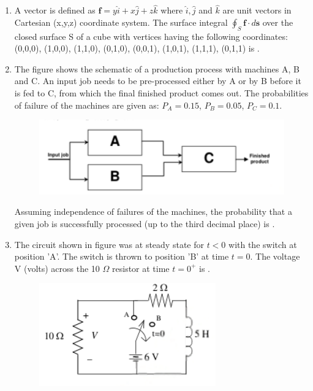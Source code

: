 \documentclass[journal,12pt,onecolumn]{IEEEtran}
\theoremstyle{remark}
\begin{document}
\begin{enumerate}
    \item A vector is defined as $\mathbf{f} = y\hat{i} + x\hat{j} + z\hat{k}$ where $\hat{i}, \hat{j}$ and $\hat{k}$ are unit vectors in Cartesian (x,y,z) coordinate system. The surface integral $\oint_S \mathbf{f} \cdot d\mathbf{s}$ over the closed surface S of a cube with vertices having the following coordinates: (0,0,0), (1,0,0), (1,1,0), (0,1,0), (0,0,1), (1,0,1), (1,1,1), (0,1,1) is \underline{\hspace{2cm}}.

    \vspace{0.5cm}

    \item The figure shows the schematic of a production process with machines A, B and C. An input job needs to be pre-processed either by A or by B before it is fed to C, from which the final finished product comes out. The probabilities of failure of the machines are given as: $P_A = 0.15$, $P_B = 0.05$, $P_C = 0.1$.
    \begin{figure}[H]
        \centering
        \includegraphics[width=0.4\columnwidth]{q5}
        \caption*{}
        \label{fig:placeholder}
    \end{figure}
    Assuming independence of failures of the machines, the probability that a given job is successfully processed (up to the third decimal place) is \underline{\hspace{2cm}}.

    \vspace{0.5cm}

    \item The circuit shown in figure was at steady state for $t < 0$ with the switch at position 'A'. The switch is thrown to position 'B' at time $t = 0$. The voltage V (volts) across the 10 $\Omega$ resistor at time $t=0^+$ is \underline{\hspace{2cm}}.
    \begin{figure}[H]
        \centering
        \includegraphics[width=0.4\columnwidth]{q6}
        \caption*{}
        \label{fig:placeholder}
    \end{figure}


\end{enumerate}
\end{document}
